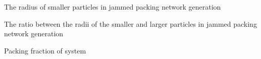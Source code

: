 \begin{eqlist}

    \item[$\R0$]
    The radius of smaller particles in jammed packing network generation
    \item[$f$]
    The ratio between the radii of the smaller and larger particles in jammed packing network generation
    \item[$\phi$]
    Packing fraction of system
    
\end{eqlist}